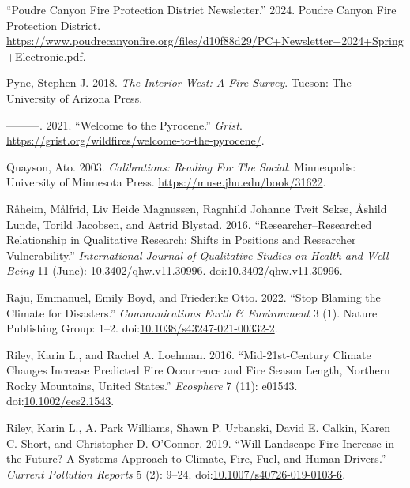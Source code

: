 \documentclass[
]{article}
\newlength{\cslhangindent}
\newenvironment{CSLReferences}[2] %
 {\begin{list}{}{%
  \setlength{\itemindent}{0pt}
  \setlength{\leftmargin}{0pt}
  \setlength{\parsep}{0pt}
  \ifodd #1
   \setlength{\leftmargin}{\cslhangindent}
   \setlength{\itemindent}{-1\cslhangindent}
  \fi
  \setlength{\itemsep}{#2\baselineskip}}}
 {\end{list}}
\begin{document}
\begin{CSLReferences}{1}{0}
{``Poudre {Canyon Fire Protection District Newsletter}.''} 2024. Poudre Canyon Fire Protection District. \url{https://www.poudrecanyonfire.org/files/d10f88d29/PC+Newsletter+2024+Spring+Electronic.pdf}.

Pyne, Stephen J. 2018. \emph{The {Interior West}: {A Fire Survey}}. Tucson: The University of Arizona Press.

---------. 2021. {``Welcome to the {Pyrocene}.''} \emph{Grist}. \url{https://grist.org/wildfires/welcome-to-the-pyrocene/}.

Quayson, Ato. 2003. \emph{Calibrations: {Reading For The Social}}. Minneapolis: University of Minnesota Press. \url{https://muse.jhu.edu/book/31622}.

Råheim, Målfrid, Liv Heide Magnussen, Ragnhild Johanne Tveit Sekse, Åshild Lunde, Torild Jacobsen, and Astrid Blystad. 2016. {``Researcher--Researched Relationship in Qualitative Research: {Shifts} in Positions and Researcher Vulnerability.''} \emph{International Journal of Qualitative Studies on Health and Well-Being} 11 (June): 10.3402/qhw.v11.30996. doi:\href{https://doi.org/10.3402/qhw.v11.30996}{10.3402/qhw.v11.30996}.

Raju, Emmanuel, Emily Boyd, and Friederike Otto. 2022. {``Stop Blaming the Climate for Disasters.''} \emph{Communications Earth \& Environment} 3 (1). Nature Publishing Group: 1--2. doi:\href{https://doi.org/10.1038/s43247-021-00332-2}{10.1038/s43247-021-00332-2}.

Riley, Karin L., and Rachel A. Loehman. 2016. {``Mid-21st-Century Climate Changes Increase Predicted Fire Occurrence and Fire Season Length, {Northern Rocky Mountains}, {United States}.''} \emph{Ecosphere} 7 (11): e01543. doi:\href{https://doi.org/10.1002/ecs2.1543}{10.1002/ecs2.1543}.

Riley, Karin L., A. Park Williams, Shawn P. Urbanski, David E. Calkin, Karen C. Short, and Christopher D. O'Connor. 2019. {``Will {Landscape Fire Increase} in the {Future}? {A Systems Approach} to {Climate}, {Fire}, {Fuel}, and {Human Drivers}.''} \emph{Current Pollution Reports} 5 (2): 9--24. doi:\href{https://doi.org/10.1007/s40726-019-0103-6}{10.1007/s40726-019-0103-6}.


\end{CSLReferences}
\end{document}
